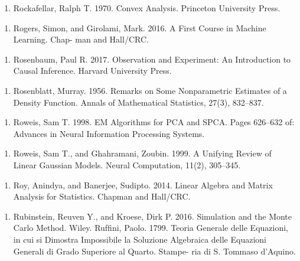 \begin{enumerate}
\item Rockafellar, Ralph T. 1970. Convex Analysis. Princeton University Press.
\end{enumerate}

\begin{enumerate}
\item Rogers, Simon, and Girolami, Mark. 2016. A First Course in Machine Learning. Chap- man and Hall/CRC.
\end{enumerate}

\begin{enumerate}
\item Rosenbaum, Paul R. 2017. Observation and Experiment: An Introduction to Causal Inference. Harvard University Press.
\end{enumerate}

\begin{enumerate}
\item Rosenblatt, Murray. 1956. Remarks on Some Nonparametric Estimates of a Density Function. Annals of Mathematical Statistics, 27(3), 832–837.
\end{enumerate}

\begin{enumerate}
\item Roweis, Sam T. 1998. EM Algorithms for PCA and SPCA. Pages 626–632 of: Advances in Neural Information Processing Systems.
\end{enumerate}

\begin{enumerate}
\item Roweis, Sam T., and Ghahramani, Zoubin. 1999. A Unifying Review of Linear Gaussian Models. Neural Computation, 11(2), 305–345.
\end{enumerate}

\begin{enumerate}
\item Roy, Anindya, and Banerjee, Sudipto. 2014. Linear Algebra and Matrix Analysis for Statistics. Chapman and Hall/CRC.
\end{enumerate}

\begin{enumerate}
\item Rubinstein, Reuven Y., and Kroese, Dirk P. 2016. Simulation and the Monte Carlo Method. Wiley. Rufﬁni, Paolo. 1799. Teoria Generale delle Equazioni, in cui si Dimostra Impossibile la Soluzione Algebraica delle Equazioni Generali di Grado Superiore al Quarto. Stampe- ria di S. Tommaso d’Aquino.
\end{enumerate}

